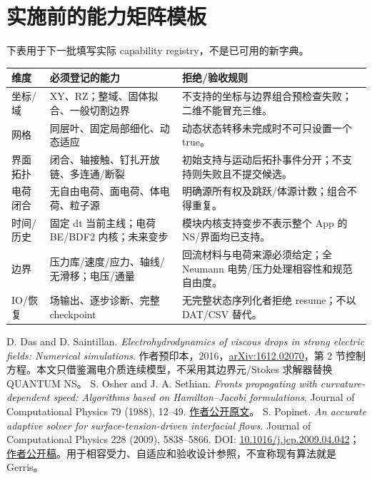 \documentclass[UTF8,a4paper,11pt,fontset=fandol]{ctexart}
\numberwithin{equation}{section}
\begin{document}
\section{实施前的能力矩阵模板}
下表用于下一批填写实际 capability registry，不是已可用的新字典。
\begin{longtable}{@{}P{.28\textwidth}P{.32\textwidth}P{.34\textwidth}@{}}
\toprule 维度 & 必须登记的能力 & 拒绝/验收规则\\\midrule\endhead
坐标/域 & XY、RZ；整域、固体拟合、一般切割边界 & 不支持的坐标与边界组合预检查失败；二维不能冒充三维。\\
网格 & 同层叶、固定局部细化、动态适应 & 动态状态转移未完成时不可只设置一个 true。\\
界面拓扑 & 闭合、轴接触、钉扎开放链、多连通/断裂 & 初始支持与运动后拓扑事件分开；不支持则失败且不提交候选。\\
电荷闭合 & 无自由电荷、面电荷、体电荷、粒子源 & 明确源所有权及跳跃/体源计数；组合不得重复。\\
时间/历史 & 固定 dt 当前主线；电荷 BE/BDF2 内核；未来变步 & 模块内核支持变步不表示整个 App 的 NS/界面均已支持。\\
边界 & 压力库/速度/应力、轴线/无滑移；电压/通量 & 回流材料与电荷来源必须给定；全 Neumann 电势/压力处理相容性和规范自由度。\\
IO/恢复 & 场输出、逐步诊断、完整 checkpoint & 无完整状态序列化者拒绝 resume；不以 DAT/CSV 替代。\\
\bottomrule
\end{longtable}

\begin{thebibliography}{9}
 D. Das and D. Saintillan. \textit{Electrohydrodynamics of viscous drops in strong electric fields: Numerical simulations}. 作者预印本，2016，\href{https://arxiv.org/pdf/1612.02070}{arXiv:1612.02070}，第 2 节控制方程。本文只借鉴漏电介质连续模型，不采用其边界元/Stokes 求解器替换 QUANTUM NS。
 S. Osher and J. A. Sethian. \textit{Fronts propagating with curvature-dependent speed: Algorithms based on Hamilton--Jacobi formulations}. Journal of Computational Physics 79 (1988), 12--49. \href{https://math.berkeley.edu/~sethian/Papers/sethian.osher.88.pdf}{作者公开原文}。
 S. Popinet. \textit{An accurate adaptive solver for surface-tension-driven interfacial flows}. Journal of Computational Physics 228 (2009), 5838--5866. DOI: \href{https://doi.org/10.1016/j.jcp.2009.04.042}{10.1016/j.jcp.2009.04.042}；\href{https://gerris.dalembert.upmc.fr/papers/tension.pdf}{作者公开稿}。用于相容受力、自适应和验收设计参照，不宣称现有算法就是 Gerris。
\end{thebibliography}
\end{document}
